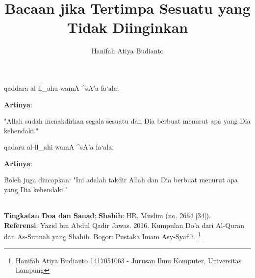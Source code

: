 \documentclass[a4paper,12pt]{article}
\title{\Large Bacaan jika Tertimpa Sesuatu yang Tidak Diinginkan}
\author{\calligra Hanifah Atiya Budianto}
\begin{document}
\sffamily
\maketitle 
\fullvocalize
{}
\begin{arabtext}
\noindent
qaddara al-ll_ahu wamA ^sA'a fa`ala.\\
\end{arabtext}
\noindent
\textbf{Artinya}:
\par
\indent
"Allah sudah menakdirkan segala sesuatu dan Dia berbuat menurut apa yang 
Dia kehendaki."\\
\begin{arabtext}
\noindent
qadaru al-ll_ahi wamA ^sA'a fa`ala.\\
\end{arabtext}
\noindent
\textbf{Artinya}:
\par
\indent
Boleh juga diucapkan: "Ini adalah takdir Allah dan Dia berbuat menurut apa 
yang Dia kehendaki."\\\\
\par
\noindent
\textbf{Tingkatan Doa dan Sanad}: \textbf{Shahih}: HR. Muslim (no. 2664 
[34]).\\
\textbf{Referensi}: Yazid bin Abdul Qadir Jawas. 2016. Kumpulan Do'a dari
Al-Quran dan As-Sunnah yang Shahih. Bogor: Pustaka Imam Asy-Syafi'i.
\footnote{Hanifah Atiya Budianto 1417051063 - Jurusan Ilmu Komputer,
Universitas Lampung}
\end{document}
